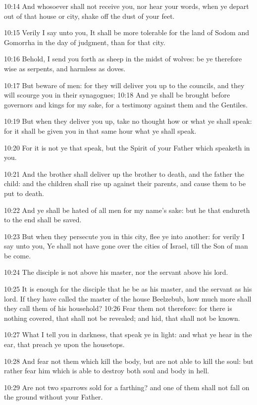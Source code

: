 10:14 And whosoever shall not receive you, nor hear your words, when
ye depart out of that house or city, shake off the dust of your feet.

10:15 Verily I say unto you, It shall be more tolerable for the land
of Sodom and Gomorrha in the day of judgment, than for that city.

10:16 Behold, I send you forth as sheep in the midst of wolves: be ye
therefore wise as serpents, and harmless as doves.

10:17 But beware of men: for they will deliver you up to the councils,
and they will scourge you in their synagogues; 10:18 And ye shall be
brought before governors and kings for my sake, for a testimony
against them and the Gentiles.

10:19 But when they deliver you up, take no thought how or what ye
shall speak: for it shall be given you in that same hour what ye shall
speak.

10:20 For it is not ye that speak, but the Spirit of your Father which
speaketh in you.

10:21 And the brother shall deliver up the brother to death, and the
father the child: and the children shall rise up against their
parents, and cause them to be put to death.

10:22 And ye shall be hated of all men for my name's sake: but he that
endureth to the end shall be saved.

10:23 But when they persecute you in this city, flee ye into another:
for verily I say unto you, Ye shall not have gone over the cities of
Israel, till the Son of man be come.

10:24 The disciple is not above his master, nor the servant above his
lord.

10:25 It is enough for the disciple that he be as his master, and the
servant as his lord. If they have called the master of the house
Beelzebub, how much more shall they call them of his household?  10:26
Fear them not therefore: for there is nothing covered, that shall not
be revealed; and hid, that shall not be known.

10:27 What I tell you in darkness, that speak ye in light: and what ye
hear in the ear, that preach ye upon the housetops.

10:28 And fear not them which kill the body, but are not able to kill
the soul: but rather fear him which is able to destroy both soul and
body in hell.

10:29 Are not two sparrows sold for a farthing? and one of them shall
not fall on the ground without your Father.

